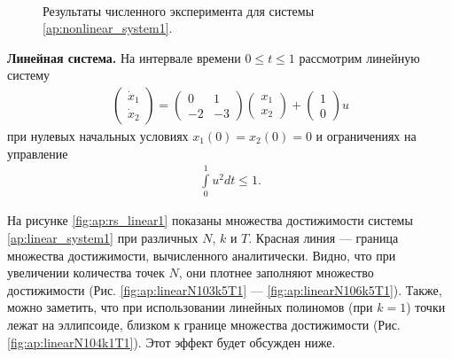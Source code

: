 \documentclass[../main.tex]{subfiles}
\begin{document}
\begin{figure}[ht!]
\begin{minipage}[b]{.3\linewidth}
 	\end{minipage} 
 	\caption{Результаты численного эксперимента для системы \eqref{ap:nonlinear_system1}.}\label{fig:ap:rs_nonlinear1}
 \end{figure}
 
 \textbf{Линейная система.} На интервале времени $ 0 \leqslant t \leqslant 1$ рассмотрим линейную систему 
 \begin{gather}\label{ap:linear_system1}
 	\begin{pmatrix} 
 		\dot{x}_1 \\
 		\dot{x}_2 
 	\end{pmatrix} = 
 	\begin{pmatrix}
 		0 & 1 \\
 		-2 & -3
 	\end{pmatrix}
 	\begin{pmatrix} 
 		x_1 \\
 		x_2 
 	\end{pmatrix} +
 	\begin{pmatrix} 1 \\ 0
 	\end{pmatrix} u
 \end{gather}
 при нулевых начальных условиях $x_1(0) = x_2(0) = 0 $ и ограничениях на управление 
 \begin{gather*}
 	\int\limits_0^1 u^2dt \leqslant 1.
 \end{gather*}
 
 На рисунке \ref{fig:ap:rs_linear1} показаны множества достижимости системы \eqref{ap:linear_system1} при различных $N$, $k$ и $T$.
 Красная линия --- граница множества достижимости, вычисленного аналитически.
 Видно, что при увеличении количества точек $N$, они плотнее заполняют множество достижимости (Рис. \ref{fig:ap:linearN103k5T1} --- \ref{fig:ap:linearN106k5T1}). 
 Также, можно заметить, что при использовании линейных полиномов (при $k = 1$) точки лежат на эллипсоиде, близком к границе множества достижимости (Рис. \ref{fig:ap:linearN104k1T1}). 
 Этот эффект будет обсужден ниже.
 
\end{document}
